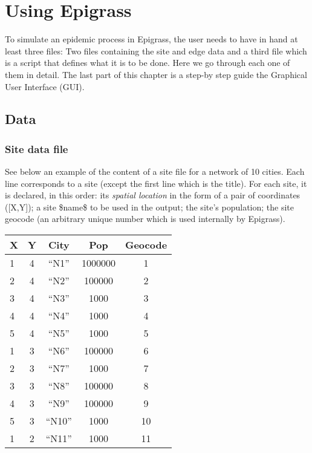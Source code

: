 \documentclass[a4paper,10pt]{manual}
\begin{document}
\resetcurrentobjects

\resetcurrentobjects


\hypertarget{using}{}\chapter{Using Epigrass}

To simulate an epidemic process in Epigrass, the user needs to have in hand at least three files: Two files containing the site and edge data and a third file which is a script that defines what it is to be done. Here we go through each one of them in detail. The last part of this chapter is a step-by step guide the Graphical User Interface (GUI).


\section{Data}


\subsection{Site data file}

See below an example of the content of a site file for a network of 10 cities. Each line corresponds to a site (except the first line which is the title). For each site, it is declared, in this order: its \emph{spatial location} in the form of a pair of coordinates ({[}X,Y{]}); a site \$name\$ to be used in the output; the site's population; the site geocode (an arbitrary unique number which is used internally by Epigrass).

\begin{tabulary}{\textwidth}{|l|c|c|c|c|}
\hline
\textbf{
X
} & \textbf{
Y
} & \textbf{
City
} & \textbf{
Pop
} & \textbf{
Geocode
}\\
\hline

1
 & 
4
 & 
``N1''
 & 
1000000
 & 
1
\\

2
 & 
4
 & 
``N2''
 & 
100000
 & 
2
\\

3
 & 
4
 & 
``N3''
 & 
1000
 & 
3
\\

4
 & 
4
 & 
``N4''
 & 
1000
 & 
4
\\

5
 & 
4
 & 
``N5''
 & 
1000
 & 
5
\\

1
 & 
3
 & 
``N6''
 & 
100000
 & 
6
\\

2
 & 
3
 & 
``N7''
 & 
1000
 & 
7
\\

3
 & 
3
 & 
``N8''
 & 
100000
 & 
8
\\

4
 & 
3
 & 
``N9''
 & 
100000
 & 
9
\\

5
 & 
3
 & 
``N10''
 & 
1000
 & 
10
\\

1
 & 
2
 & 
``N11''
 & 
1000
 & 
11
\\
\hline
\end{tabulary}
\end{document}
